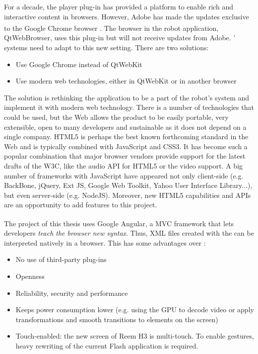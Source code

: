 For a decade, the \flash player plug-in has provided a platform to enable rich and interactive content in browsers.
However, Adobe has made the updates exclusive to the Google Chrome\textsuperscript{\textcopyright}\xspace browser \cite{FlashRoadmap}. 
The browser in the robot application, QtWebBrowser, uses this plug-in but will not receive updates from Adobe. \company ' systems need to adapt to this new setting. 
There are two solutions:
\begin{itemize}
	\item Use Google Chrome instead of QtWebKit
	\item Use modern web technologies, either in QtWebKit or in another browser
\end{itemize}

The solution is rethinking the application to be a part of the robot's system and implement it with modern web technology.
There is a number of technologies that could be used, but the Web allows the product to be easily portable, very extensible, open to many developers and sustainable as it does not depend on a single company.
\ac{HTML5} is perhaps the best known forthcoming standard in the Web and is typically combined with JavaScript and \ac{CSS3}. 
It has become such a popular combination that major browser vendors provide support for the latest drafts of the \ac{W3C}, like the audio \ac{API} for \ac{HTML5} or the video support.
A big number of frameworks with JavaScript have appeared not only client-side (e.g. BackBone, jQuery, Ext JS, Google Web Toolkit, Yahoo User Interface Library...), but even server-side (e.g. NodeJS).
Moreover, new \ac{HTML5} capabilities and \acp{API} are an opportunity to add features to this project.

The project of this thesis uses Google Angular\textsuperscript{\textcopyright}, a \ac{MVC} framework that lets developers \emph{teach the browser new syntax}. 
Thus, \ac{XML} files created with the \se can be interpreted natively in a browser. 
This has some advantages over \flash \cite{Jobs:ThoughtsOnFlash}:
\begin{itemize}
    \item No use of third-party plug-ins
    \item Openness
    \item Reliability, security and performance
    \item Keeps power consumption lower (e.g. using the GPU to decode video or apply transformations and smooth transitions to elements on the screen)
    \item Touch-enabled: the new screen of Reem H3 is multi-touch. To enable gestures, heavy rewriting of the current Flash application is required.
\end{itemize}


